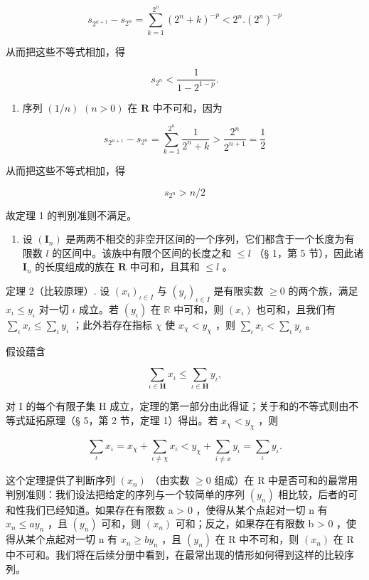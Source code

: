 \[
s _ {2 ^ {n + 1}} - s _ {2 ^ {n}} = \sum_ {k = 1} ^ {2 ^ {n}} (2 ^ {n} + k) ^ {- p} <   2 ^ {n}. (2 ^ {n}) ^ {- p}
\]

从而把这些不等式相加，得

\[
s _ {2 ^ {n}} <   \frac {1}{1 - 2 ^ {1 - p}}.
\]

\begin{enumerate}
\def\labelenumi{\arabic{enumi})}
\setcounter{enumi}{3}
\tightlist
\item
序列 \((1 / n)\) \((n > 0)\) 在 \(\mathbf{R}\) 中不可和，因为
\end{enumerate}

\[
s _ {2 ^ {n + 1}} - s _ {2 ^ {n}} = \sum_ {k = 1} ^ {2 ^ {n}} \frac {1}{2 ^ {n} + k} > \frac {2 ^ {n}}{2 ^ {n + 1}} = \frac {1}{2}
\]

从而把这些不等式相加，得

\[
s _ {2 ^ {n}} > n / 2
\]

故定理 1 的判别准则不满足。

\begin{enumerate}
\def\labelenumi{\arabic{enumi})}
\setcounter{enumi}{4}
\tightlist
\item
  设 \((\mathbf{I}_n)\) 是两两不相交的非空开区间的一个序列，它们都含于一个长度为有限数 \(l\) 的区间中。该族中有限个区间的长度之和 \(\leqslant l\) （§ 1，第 5 节），因此诸 \(\mathbf{I}_n\) 的长度组成的族在 \(\mathbf{R}\) 中可和，且其和 \(\leqslant l\) 。
\end{enumerate}

定理 2（比较原理）. 设 \((x_{\iota})_{\iota\in I}\) 与 \((y_{\iota})_{\iota\in I}\) 是有限实数 \(\geqslant 0\) 的两个族，满足 \(x_{\iota}\leqslant y_{\iota}\) 对一切 \(\iota\) 成立。若 \((y_{\iota})\) 在 \(\mathbb{R}\) 中可和，则 \((x_{\iota})\) 也可和，且我们有 \(\sum_{\iota}x_{\iota}\leqslant\sum_{\iota}y_{\iota}\) ；此外若存在指标 \(\chi\) 使 \(x_{\chi}<y_{\chi}\) ，则 \(\sum_{\iota}x_{\iota}<\sum_{\iota}y_{\iota}\) 。

假设蕴含

\[
\sum_ {\iota \in \mathbf {H}} x _ {\iota} \leqslant \sum_ {\iota \in \mathbf {H}} y _ {\iota},
\]

对 I 的每个有限子集 H 成立，定理的第一部分由此得证；关于和的不等式则由不等式延拓原理（§ 5，第 2 节，定理 1）得出。若 \(x_{\chi} < y_{\chi}\) ，则

\[
\sum_ {\iota} x _ {\iota} = x _ {\chi} + \sum_ {\iota \neq \chi} x _ {\iota} <   y _ {\chi} + \sum_ {i \neq x} y _ {\iota} = \sum_ {\iota} y _ {\iota}.
\]

这个定理提供了判断序列 \((x_{n})\) （由实数 \(\geqslant0\) 组成）在 R 中是否可和的最常用判别准则：我们设法把给定的序列与一个较简单的序列 \((y_{n})\) 相比较，后者的可和性我们已经知道。如果存在有限数 a \textgreater{} 0 ，使得从某个点起对一切 n 有 \(x_{n} \leqslant ay_{n}\) ，且 \((y_{n})\) 可和，则 \((x_{n})\) 可和；反之，如果存在有限数 b \textgreater{} 0 ，使得从某个点起对一切 n 有 \(x_{n} \geqslant by_{n}\) ，且 \((y_{n})\) 在 R 中不可和，则 \((x_{n})\) 在 R 中不可和。我们将在后续分册中看到，在最常出现的情形如何得到这样的比较序列。

